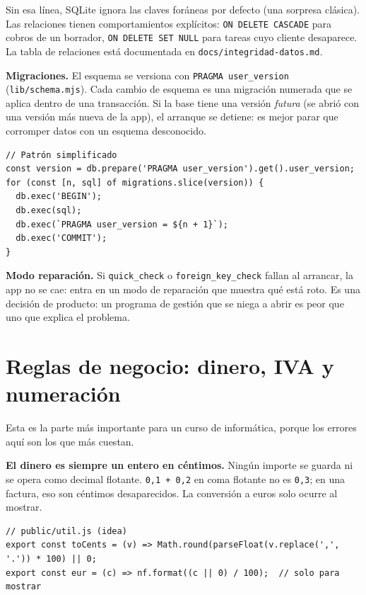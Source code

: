 Sin esa línea, SQLite ignora las claves foráneas por defecto (una sorpresa clásica). Las relaciones tienen comportamientos explícitos: \texttt{ON\ DELETE\ CASCADE} para cobros de un borrador, \texttt{ON\ DELETE\ SET\ NULL} para tareas cuyo cliente desaparece. La tabla de relaciones está documentada en \texttt{docs/integridad-datos.md}.

\textbf{Migraciones.} El esquema se versiona con \texttt{PRAGMA\ user\_version} (\texttt{lib/schema.mjs}). Cada cambio de esquema es una migración numerada que se aplica dentro de una transacción. Si la base tiene una versión \emph{futura} (se abrió con una versión más nueva de la app), el arranque se detiene: es mejor parar que corromper datos con un esquema desconocido.

\begin{verbatim}
// Patrón simplificado
const version = db.prepare('PRAGMA user_version').get().user_version;
for (const [n, sql] of migrations.slice(version)) {
  db.exec('BEGIN');
  db.exec(sql);
  db.exec(`PRAGMA user_version = ${n + 1}`);
  db.exec('COMMIT');
}
\end{verbatim}

\textbf{Modo reparación.} Si \texttt{quick\_check} o \texttt{foreign\_key\_check} fallan al arrancar, la app no se cae: entra en un modo de reparación que muestra qué está roto. Es una decisión de producto: un programa de gestión que se niega a abrir es peor que uno que explica el problema.

\chapter{Reglas de negocio: dinero, IVA y numeración}\label{reglas-de-negocio-dinero-iva-y-numeraciuxf3n}

Esta es la parte más importante para un curso de informática, porque los errores aquí son los que más cuestan.

\textbf{El dinero es siempre un entero en céntimos.} Ningún importe se guarda ni se opera como decimal flotante. \texttt{0,1\ +\ 0,2} en coma flotante no es \texttt{0,3}; en una factura, eso son céntimos desaparecidos. La conversión a euros solo ocurre al mostrar.

\begin{verbatim}
// public/util.js (idea)
export const toCents = (v) => Math.round(parseFloat(v.replace(',', '.')) * 100) || 0;
export const eur = (c) => nf.format((c || 0) / 100);  // solo para mostrar
\end{verbatim}

